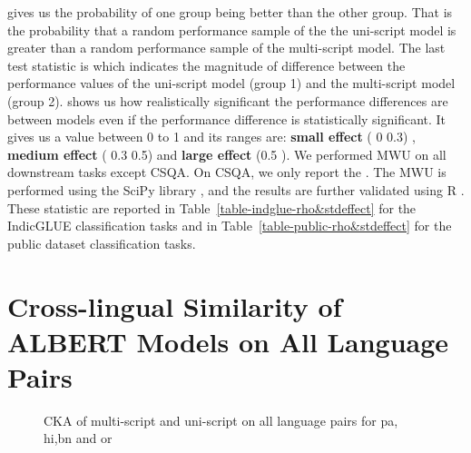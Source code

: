 \documentclass[11pt]{article}
\begin{document}
 gives us the probability of one group being better than the other group. That is the probability that a random performance sample of the the uni-script model is greater than a random performance sample of the multi-script  model. The last test statistic is  which indicates the magnitude of difference between the performance values of the uni-script model (group 1) and the multi-script model (group 2).  shows us how realistically significant the performance differences are between models even if the performance difference is statistically significant. It gives us a value between 0 to 1 and its ranges are: \textbf{small effect}  ( 0    0.3) , \textbf{medium effect} ( 0.3    0.5) and \textbf{large effect} (0.5  ). We performed MWU on all downstream tasks except CSQA. On CSQA, we only report the . The MWU is performed using the SciPy library \citep{2020SciPy-NMeth}, and the results are further validated using R \citep{sjstats}. These statistic are reported in Table~\ref{table-indglue-rho&stdeffect} for the IndicGLUE classification tasks and in Table~\ref{table-public-rho&stdeffect} for the public dataset classification tasks.



\section{Cross-lingual Similarity of ALBERT Models on All Language Pairs}
\label{sec:app_cka}
\begin{figure*}[hbt!]
\begin{center}
\centering
{}
\hfill
{}
\hfill
{}
\hfill
{}
\hfill
{}
\hfill
{}
\hfill
{}
\hfill
{}
\hfill

\caption{CKA of multi-script and uni-script on all language pairs for pa, hi,bn and or}
\label{cka_all_language_pairs_pa_to_or}
\end{center}
\end{figure*}
\end{document}

